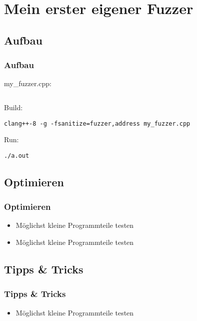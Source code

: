 \section{Mein erster eigener Fuzzer}
\subsection{Aufbau}
\begin{frame}[fragile]
	\frametitle{Aufbau}

	my\_fuzzer.cpp:
	\inputminted[fontsize=\scriptsize,linenos]{cpp}{snippets/first_fuzzer.cpp}
	\vspace{5mm}

	Build:
	\begin{verbatim}
clang++-8 -g -fsanitize=fuzzer,address my_fuzzer.cpp
  \end{verbatim}
	\vspace{5mm}

	Run:
	\begin{verbatim}
./a.out
  \end{verbatim}
\end{frame}

\subsection{Optimieren}
\begin{frame}[fragile]
	\frametitle{Optimieren}

	\begin{itemize}
		\item Möglichst kleine Programmteile testen
		\item Möglichst kleine Programmteile testen
	\end{itemize}
\end{frame}

\subsection{Tipps \& Tricks}
\begin{frame}[fragile]
	\frametitle{Tipps \& Tricks}

	\begin{itemize}
		\item Möglichst kleine Programmteile testen
	\end{itemize}
\end{frame}
